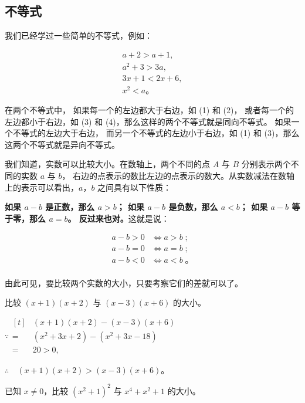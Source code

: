 \subsection{不等式}\label{subsec:3-1} %

我们已经学过一些简单的不等式，例如：

\begin{align}
    a + 2 > a + 1, \tag{$1$} \\
    a^2 + 3 > 3a, \tag{$2$} \\
    3x + 1 < 2x + 6, \tag{$3$} \\
    x^2 < a \tag{$4$} \text{。}
\end{align}

在两个不等式中，
如果每一个的左边都大于右边，如 (1) 和 (2)，
或者每一个的左边都小于右边，如 (3) 和 (4)，那么这样的两个不等式就是同向不等式。
如果一个不等式的左边大于右边，
而另一个不等式的左边小于右边，如 (1) 和 (3)，那么这两个不等式就是异向不等式。

我们知道，实数可以比较大小。在数轴上，两个不同的点 $A$ 与 $B$ 分别表示两个不同的实数 $a$ 与 $b$，
右边的点表示的数比左边的点表示的数大。从实数减法在数轴上的表示可以看出，$a$，$b$ 之间具有以下性质：

\textbf{
    如果 $a - b$ 是正数，那么 $a > b$；
    如果 $a - b$ 是负数，那么 $a < b$；
    如果 $a - b$ 等于零，那么 $a = b$。
反过来也对。}这就是说：

\begin{align*}
    a - b > 0 &\iff a > b \; ; \\
    a - b = 0 &\iff a = b \; ; \\
    a - b < 0 &\iff a < b \; \text{。} \\
\end{align*}

由此可见，要比较两个实数的大小，只要考察它们的差就可以了。

\liti 比较 $(x+1)(x+2)$ 与 $(x-3)(x+6)$ 的大小。

\jie $\because \begin{aligned}[t]
         & (x+1)(x+2) - (x-3)(x+6) \\
    ={} & (x^2 + 3x + 2) - (x^2 + 3x -18) \\
    ={} & 20 > 0,
\end{aligned}$

$\therefore \quad (x+1)(x+2) > (x-3)(x+6)$。


\liti 已知 $x \neq 0$，比较 $(x^2 + 1)^2$ 与 $x^4 + x^2 + 1$ 的大小。

